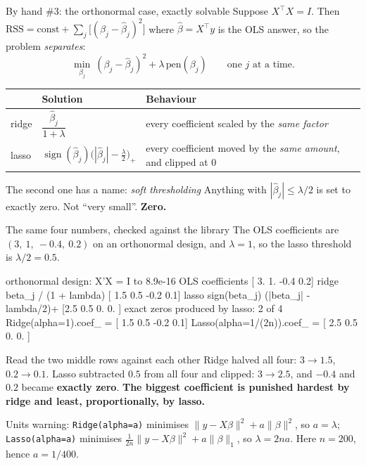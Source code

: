 \documentclass[aspectratio=169]{beamer}
\begin{document}
\begin{frame}[shrink=6]{By hand \#3: the orthonormal case, exactly solvable}
  Suppose $X^{\!\top}\!X = I$. Then
  $\text{RSS} = \text{const} + \sum_j\big[(\beta_j - \hat\beta_j)^2\big]$
  where $\hat\beta = X^{\!\top}y$ is the OLS answer, so the problem
  \emph{separates}:
  \[
    \min_{\beta_j}\ (\beta_j - \hat\beta_j)^2 + \lambda\,\text{pen}(\beta_j)
    \qquad\text{one $j$ at a time.}
  \]
  \begin{center}\small
  \begin{tabular}{@{}lll@{}}
    \toprule
    & \textbf{Solution} & \textbf{Behaviour}\\
    \midrule
    ridge & $\dfrac{\hat\beta_j}{1 + \lambda}$
      & every coefficient scaled by the \emph{same factor}\\[8pt]
    lasso & $\operatorname{sign}(\hat\beta_j)
      \big(|\hat\beta_j| - \tfrac{\lambda}{2}\big)_{+}$
      & every coefficient moved by the \emph{same amount}, and clipped at
        $0$\\
    \bottomrule
  \end{tabular}
  \end{center}
  \begin{block}{The second one has a name: \emph{soft thresholding}}
    \small Anything with $|\hat\beta_j| \le \lambda/2$ is set to exactly zero.
    Not ``very small''. \textbf{Zero.}
  \end{block}
\end{frame}

\begin{frame}[fragile,shrink=8]{The same four numbers, checked against the library}
The OLS coefficients are $(3,\ 1,\ -0.4,\ 0.2)$ on an orthonormal design, and
$\lambda = 1$, so the lasso threshold is $\lambda/2 = 0.5$.
\begin{outblk}
orthonormal design: X'X = I to 8.9e-16
OLS coefficients         [ 3.   1.  -0.4  0.2]
  ridge  beta_j / (1 + lambda)               [ 1.5  0.5 -0.2  0.1]
  lasso  sign(beta_j) (|beta_j| - lambda/2)+ [2.5 0.5 0.  0. ]
  exact zeros produced by lasso: 2 of 4
  Ridge(alpha=1).coef_ =         [ 1.5  0.5 -0.2  0.1]
  Lasso(alpha=1/(2n)).coef_ =    [ 2.5  0.5 0.  0. ]
\end{outblk}
\begin{alertblock}{Read the two middle rows against each other}
  \footnotesize Ridge halved all four: $3 \to 1.5$, $0.2 \to 0.1$. Lasso
  subtracted $0.5$ from all four and clipped: $3 \to 2.5$, and
  $-0.4$ and $0.2$ became \textbf{exactly zero}. \textbf{The biggest
  coefficient is punished hardest by ridge and least, proportionally, by
  lasso.}
\end{alertblock}
\begin{center}\footnotesize
  Units warning: \texttt{Ridge(alpha=a)} minimises
  $\|y-X\beta\|^2 + a\|\beta\|^2$, so $a = \lambda$; \texttt{Lasso(alpha=a)}
  minimises $\frac{1}{2n}\|y-X\beta\|^2 + a\|\beta\|_1$, so
  $\lambda = 2na$. Here $n = 200$, hence $a = 1/400$.
\end{center}
\end{frame}
\end{document}
